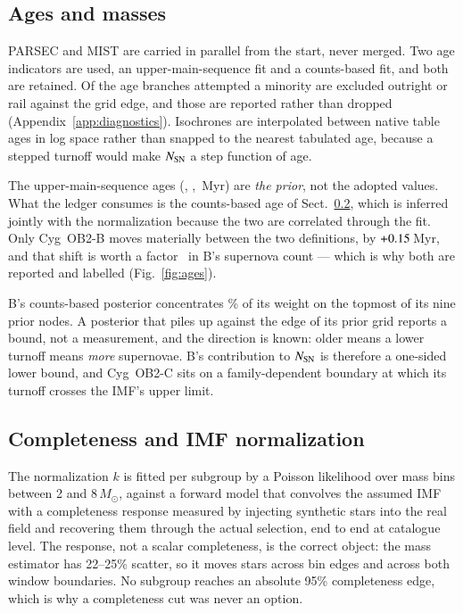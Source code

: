 \documentclass{aa}
\begin{document}
\subsection{Ages and masses}\label{sec:ages}

PARSEC and MIST are carried in parallel from the start, never merged. Two age
indicators are used, an upper-main-sequence fit and a counts-based fit, and both
are retained. Of the age branches attempted a minority are excluded outright or
rail against the grid edge, and those are reported rather than dropped
(Appendix~\ref{app:diagnostics}). Isochrones are interpolated between native
table ages in log space rather than snapped to the nearest tabulated age,
because a stepped turnoff would make $N_{\rm SN}$ a step function of age.

The upper-main-sequence ages (\ageumsA, \ageumsB, \ageumsC\,Myr) are
\emph{the prior}, not the adopted values. What the ledger consumes is the
counts-based age of Sect.~\ref{sec:imf}, which is inferred jointly with the
normalization because the two are correlated through the fit. Only Cyg~OB2-B
moves materially between the two definitions, by $+0.15$\,Myr, and that
shift is worth a factor \snRatioB\ in B's supernova count --- which is why both
are reported and labelled (Fig.~\ref{fig:ages}).

B's counts-based posterior concentrates \railB\% of its weight on the topmost of
its nine prior nodes. A posterior that piles up against the edge of its prior
grid reports a bound, not a measurement, and the direction is known: older means
a lower turnoff means \emph{more} supernovae. B's contribution to $N_{\rm SN}$
is therefore a one-sided lower bound, and Cyg~OB2-C sits on a family-dependent
boundary at which its turnoff crosses the IMF's upper limit.

\subsection{Completeness and IMF normalization}\label{sec:imf}

The normalization $k$ is fitted per subgroup by a Poisson likelihood over mass
bins between 2 and 8\,$M_\odot$, against a forward model that convolves the
assumed IMF with a completeness response measured by injecting synthetic stars
into the real field and recovering them through the actual selection, end to
end at catalogue level. The response, not a scalar completeness, is the correct
object: the mass estimator has 22--25\% scatter, so it moves stars across bin
edges and across both window boundaries. No subgroup reaches an absolute 95\%
completeness edge, which is why a completeness cut was never an option.
\end{document}
